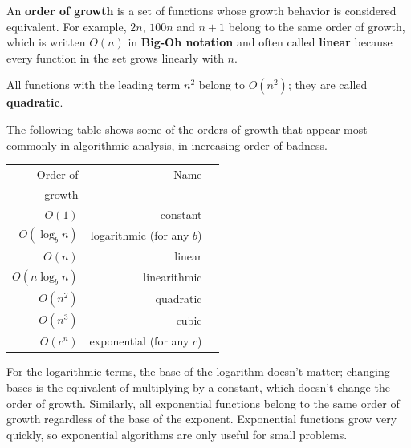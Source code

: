 \documentclass[10pt]{book}
\begin{document}
An {\bf order of growth} is a set of functions whose growth
behavior is considered equivalent.  For example, $2n$, $100n$ and $n+1$
belong to the same order of growth, which is written $O(n)$ in
{\bf Big-Oh notation} and often called {\bf linear} because every function
in the set grows linearly with $n$.

All functions with the leading term $n^2$ belong to $O(n^2)$; they are
called {\bf quadratic}.

The following table shows some of the orders of growth that
appear most commonly in algorithmic analysis,
in increasing order of badness.

\begin{tabular}{|r|r|r|}
\hline
Order of     &   Name      \\
growth       &               \\
\hline
$O(1)$             & constant \\
$O(\log_b n)$      & logarithmic (for any $b$) \\
$O(n)$             & linear \\
$O(n \log_b n)$    & linearithmic \\
$O(n^2)$           & quadratic     \\
$O(n^3)$           & cubic     \\
$O(c^n)$           & exponential (for any $c$)    \\
\hline
\end{tabular}

For the logarithmic terms, the base of the logarithm doesn't matter;
changing bases is the equivalent of multiplying by a constant, which
doesn't change the order of growth.  Similarly, all exponential
functions belong to the same order of growth regardless of the base of
the exponent.
Exponential functions grow very quickly, so exponential algorithms are
only useful for small problems.
\end{document}
